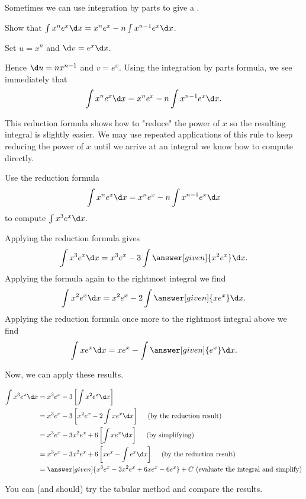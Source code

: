 \documentclass{ximera}
\begin{document}
Sometimes we can use integration by parts to give a .

\begin{example}
  Show that $  \int x^n e^x \d x = x^n e^x -n \int x^{n-1} e^x\d x$.
  \begin{explanation}
   Set $u= x^n$ and $\d v = e^x \d x$. 
   
   Hence $\d u = n x^{n-1}$ and $v = e^x$. Using the
    integration by parts formula, we see immediately that
    \[
    \int x^n e^x \d x = x^n e^x -n \int x^{n-1} e^x \d x.
    \]
  \end{explanation}
\end{example}

This reduction formula shows how to "reduce" the power of $x$ so the resulting integral is slightly easier. We may use repeated applications of this rule to keep reducing the power of $x$ until we arrive at an integral we know how to compute directly. 

\begin{example}
  Use the reduction formula
  \[
  \int x^n e^x \d x = x^n e^x -n \int x^{n-1} e^x\d x
  \]
  to compute $\int x^3 e^x \d x.$
  
  \begin{explanation}
  Applying the reduction formula gives
    \[
    \int x^3 e^x \d x = x^3e^x -3\int \answer[given]{x^2 e^x}\d x.
    \]
    Applying the formula again to the rightmost integral we find
    \[
    \int x^{2} e^x\d x = x^2e^x - 2 \int \answer[given]{x e^x}\d x.
    \]
    Applying the reduction formula once more to the rightmost integral above we find
    \[
    \int x e^x\d x =xe^x - \int \answer[given]{e^x}\d x.
    \]

Now, we can apply these results.

\begin{align*}
        \int x^3 e^x \d x& = x^3e^x -3 \left[\int x^2 e^x\d x\right] \\
    &= x^3e^x -3 \left[    x^2e^x - 2 \int x e^x\d x     \right] \quad \textrm{ (by the reduction result)} \\
    &= x^3e^x - 3x^2e^x+6\left[ \int xe^x \d x \right] \quad \textrm{ (by simplifying)} \\
    &= x^3e^x - 3x^2e^x+6\left[ xe^x - \int  e^x \d x \right] \quad \textrm{ (by the reduction result)} \\
    & = \answer[given]{x^3e^x - 3x^2e^x+6 xe^x -6e^x} +C \textrm{ (evaluate the integral and simplify)}
\end{align*}

You can (and should) try the tabular method and compare the results.  
  \end{explanation}
\end{example}
\end{document}
